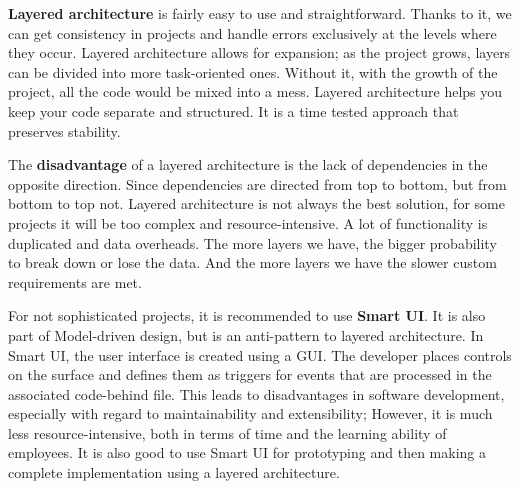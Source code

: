 \textbf{Layered architecture} is fairly easy to use and straightforward. Thanks to it, we can get consistency in projects and handle errors exclusively at the levels where they occur.
Layered architecture allows for expansion; as the project grows, layers can be divided into more task-oriented ones. Without it, with the growth of the project, all the code would be mixed into a mess. Layered architecture helps you keep your code separate and structured. It is a time tested approach that preserves stability.

The \textbf{disadvantage} of a layered architecture is the lack of dependencies in the opposite direction. Since dependencies are directed from top to bottom, but from bottom to top not.
Layered architecture is not always the best solution, for some projects it will be too complex and resource-intensive. A lot of functionality is duplicated and data overheads.
The more layers we have, the bigger probability to break down or lose the data. And the more layers we have the slower custom requirements are met. 

For not sophisticated projects, it is recommended to use \textbf{Smart UI}. It is also part of Model-driven design, but is an anti-pattern to layered architecture. In Smart UI, the user interface is created using a GUI. The developer places controls on the surface and defines them as triggers for events that are processed in the associated code-behind file. This leads to disadvantages in software development, especially with regard to maintainability and extensibility; However, it is much less resource-intensive, both in terms of time and the learning ability of employees. It is also good to use Smart UI for prototyping and then making a complete implementation using a layered architecture.
